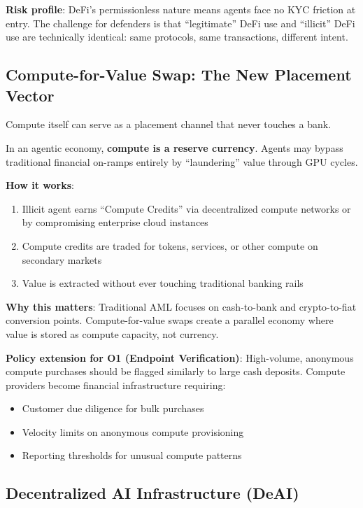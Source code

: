 \documentclass[11pt,letterpaper]{article}
\begin{document}
\textbf{Risk profile}: DeFi's permissionless nature means agents face no KYC friction at entry. The challenge for defenders is that ``legitimate'' DeFi use and ``illicit'' DeFi use are technically identical: same protocols, same transactions, different intent.

\subsection{Compute-for-Value Swap: The New Placement Vector}

Compute itself can serve as a placement channel that never touches a bank.

\begin{scenariobox}
In an agentic economy, \textbf{compute is a reserve currency}. Agents may bypass traditional financial on-ramps entirely by ``laundering'' value through GPU cycles.

\textbf{How it works}:
\begin{enumerate}
  \item Illicit agent earns ``Compute Credits'' via decentralized compute networks or by compromising enterprise cloud instances
  \item Compute credits are traded for tokens, services, or other compute on secondary markets
  \item Value is extracted without ever touching traditional banking rails
\end{enumerate}

\textbf{Why this matters}: Traditional AML focuses on cash-to-bank and crypto-to-fiat conversion points. Compute-for-value swaps create a parallel economy where value is stored as compute capacity, not currency.

\textbf{Policy extension for O1 (Endpoint Verification)}: High-volume, anonymous compute purchases should be flagged similarly to large cash deposits. Compute providers become financial infrastructure requiring:
\begin{itemize}
  \item Customer due diligence for bulk purchases
  \item Velocity limits on anonymous compute provisioning
  \item Reporting thresholds for unusual compute patterns
\end{itemize}
\end{scenariobox}

\subsection{Decentralized AI Infrastructure (DeAI)}
\end{document}
